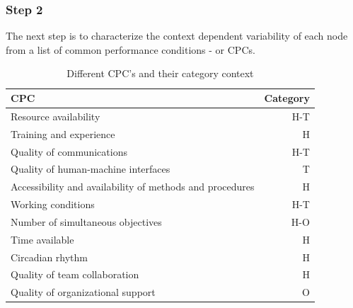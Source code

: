 \subsubsection*{Step 2}
The next step is to characterize the context dependent variability of each node from a list of common performance conditions - or CPCs. 



\begin{table}[h]
\centering
    \begin{tabular}{ | l | r | }
    \hline
    CPC                                                      & Category \\ \hline \hline
    Resource availability                                    &     H-T  \\ \hline
    Training and experience                                  &       H  \\ \hline
    Quality of communications                                &     H-T  \\ \hline
    Quality of human-machine interfaces                      &       T  \\ \hline
    Accessibility and availability of methods and procedures &       H  \\ \hline
    Working conditions                                       &     H-T  \\ \hline
    Number of simultaneous objectives                        &     H-O  \\ \hline
    Time available                                           &       H  \\ \hline
    Circadian rhythm                                         &       H  \\ \hline
    Quality of team collaboration                            &       H  \\ \hline
    Quality of organizational support                        &       O  \\ \hline
    \end{tabular}
\caption{Different CPC's and their category context}
\label{table:cpcs}
\end{table}

